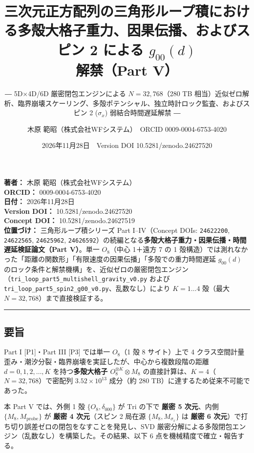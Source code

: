 \documentclass[
  a4paper,
]{ltjsarticle}
\title{三次元正方配列の三角形ループ積における多殻大格子重力、因果伝播、およびスピン
2 による \(g_{00}(d)\) 解禁（Part V）}
\subtitle{― 5D×4D/6D 厳密閉包エンジンによる \(N = 32{,}768\)（280 TB
相当）近似ゼロ解析、臨界崩壊スケーリング、多殻ポテンシャル、独立時計ロック監査、およびスピン
2 (\(\sigma_x\)) 弱結合時間遅延解禁 ―}
\author{木原 範昭（株式会社WFシステム）　ORCID 0009-0004-6753-4020}
\date{2026年11月28日　Version DOI 10.5281/zenodo.24627520}
\begin{document}
\maketitle

{
\setcounter{tocdepth}{2}
\tableofcontents
}
\textbf{著者：} 木原 範昭（株式会社WFシステム）\\
\textbf{ORCID：} 0009-0004-6753-4020\\
\textbf{日付：} 2026年11月28日\\
\textbf{Version DOI：} 10.5281/zenodo.24627520\\
\textbf{Concept DOI：} 10.5281/zenodo.24627519\\
\textbf{位置づけ：} 三角形ループ積シリーズ Part I--IV（Concept DOIs:
\texttt{24622200}, \texttt{24622565}, \texttt{24625962},
\texttt{24626592}）の続編となる\textbf{多殻大格子重力・因果伝播・時間遅延検証論文（Part
V）}。単一 \(O_8\)（中心 1＋遠方 7 の 1
殻構造）では測れなかった「距離の関数形」「有限速度の因果伝播」「多殻での重力時間遅延
\(g_{00}(d)\)
のロック条件と解禁機構」を、近似ゼロの厳密閉包エンジン（\texttt{tri\_loop\_part5\_multishell\_gravity\_v0.py}
および \texttt{tri\_loop\_part5\_spin2\_g00\_v0.py}、乱数なし）により
\(K = 1 \dots 4\) 殻（最大 \(N = 32{,}768\)）まで直接検証する。

\begin{center}\rule{0.5\linewidth}{0.5pt}\end{center}

\subsection{要旨}\label{ux8981ux65e8}

Part I {[}P1{]}・Part III {[}P3{]} では単一 \(O_8\)（1 殻 8 サイト）上で
4
クラス空間計量歪み・潮汐分裂・臨界崩壊を実証したが、中心から複数段階の距離
\(d = 0, 1, 2, \dots, K\) を持つ\textbf{多殻大格子
\(O_8^{\otimes K} \otimes M_8\)}
の直接計算は、\(K = 4\)（\(N = 32{,}768\)）で密配列
\(3.52 \times 10^{13}\) 成分（約 280
TB）に達するため従来不可能であった。

本 Part V では、外側 1 殻 \(\{O_8, \delta_{000}\}\) が \(\mathrm{Tri}\)
の下で \textbf{厳密 5 次元}、内側 \(\{M_8, M_{\mathrm{probe}}\}\) が
\textbf{厳密 4 次元}（スピン 2 局在源 \(\{M_8, M_{\sigma_x}\}\) は
\textbf{厳密 6 次元}）で打ち切り誤差ゼロの閉包をなすことを発見し、SVD
厳密分解による多殻閉包エンジン（乱数なし）を構築した。その結果、以下 6
点を機械精度で確立・報告する。
\end{document}
